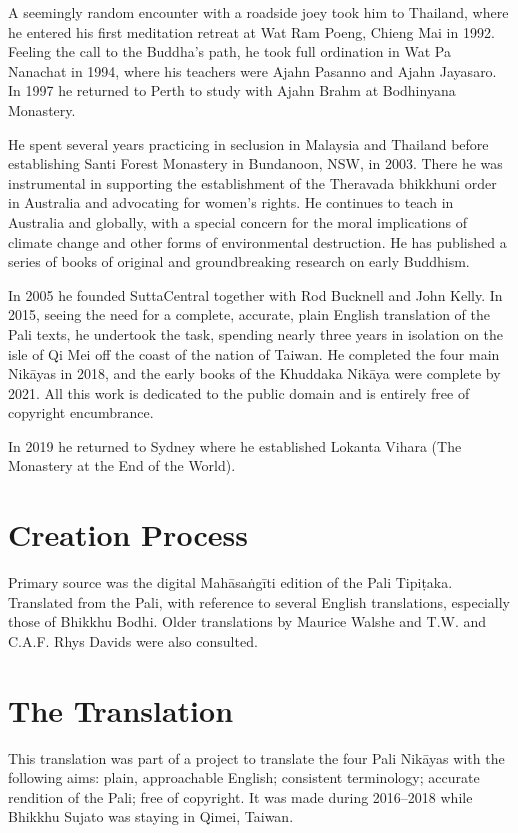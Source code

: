 \documentclass[12pt,openany]{book}%
\begin{document}
A seemingly random encounter with a roadside joey took him to Thailand, where he entered his first meditation retreat at Wat Ram Poeng, Chieng Mai in 1992. Feeling the call to the Buddha’s path, he took full ordination in Wat Pa Nanachat in 1994, where his teachers were Ajahn Pasanno and Ajahn Jayasaro. In 1997 he returned to Perth to study with Ajahn Brahm at Bodhinyana Monastery. 

He spent several years practicing in seclusion in Malaysia and Thailand before establishing Santi Forest Monastery in Bundanoon, NSW, in 2003. There he was instrumental in supporting the establishment of the Theravada bhikkhuni order in Australia and advocating for women’s rights. He continues to teach in Australia and globally, with a special concern for the moral implications of climate change and other forms of environmental destruction. He has published a series of books of original and groundbreaking research on early Buddhism. 

In 2005 he founded SuttaCentral together with Rod Bucknell and John Kelly. In 2015, seeing the need for a complete, accurate, plain English translation of the Pali texts, he undertook the task, spending nearly three years in isolation on the isle of Qi Mei off the coast of the nation of Taiwan. He completed the four main \textsanskrit{Nikāyas} in 2018, and the early books of the Khuddaka \textsanskrit{Nikāya} were complete by 2021. All this work is dedicated to the public domain and is entirely free of copyright encumbrance. 

In 2019 he returned to Sydney where he established Lokanta Vihara (The Monastery at the End of the World). 

\section*{Creation Process}

Primary source was the digital \textsanskrit{Mahāsaṅgīti} edition of the Pali \textsanskrit{Tipiṭaka}. Translated from the Pali, with reference to several English translations, especially those of Bhikkhu Bodhi. Older translations by Maurice Walshe and T.W. and C.A.F. Rhys Davids were also consulted.

\section*{The Translation}

This translation was part of a project to translate the four Pali \textsanskrit{Nikāyas} with the following aims: plain, approachable English; consistent terminology; accurate rendition of the Pali; free of copyright. It was made during 2016–2018 while Bhikkhu Sujato was staying in Qimei, Taiwan.
\end{document}
